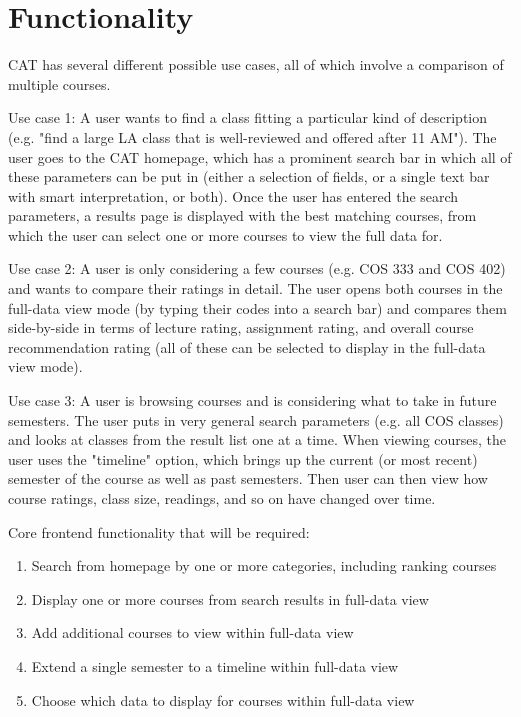 \documentclass[11pt]{article}
\begin{document}
\section{Functionality}
CAT has several different possible use cases, all of which involve a comparison of multiple courses.
\par Use case 1: A user wants to find a class fitting a particular kind of description (e.g. "find a large LA class that is well-reviewed and offered after 11 AM"). The user goes to the CAT homepage, which has a prominent search bar in which all of these parameters can be put in (either a selection of fields, or a single text bar with smart interpretation, or both). Once the user has entered the search parameters, a results page is displayed with the best matching courses, from which the user can select one or more courses to view the full data for.
\par Use case 2: A user is only considering a few courses (e.g. COS 333 and COS 402) and wants to compare their ratings in detail. The user opens both courses in the full-data view mode (by typing their codes into a search bar) and compares them side-by-side in terms of lecture rating, assignment rating, and overall course recommendation rating (all of these can be selected to display in the full-data view mode).
\par Use case 3: A user is browsing courses and is considering what to take in future semesters. The user puts in very general search parameters (e.g. all COS classes) and looks at classes from the result list one at a time. When viewing courses, the user uses the "timeline" option, which brings up the current (or most recent) semester of the course as well as past semesters. Then user can then view how course ratings, class size, readings, and so on have changed over time.

\par Core frontend functionality that will be required:
\begin{enumerate}
\item Search from homepage by one or more categories, including ranking courses
\item Display one or more courses from search results in full-data view
\item Add additional courses to view within full-data view
\item Extend a single semester to a timeline within full-data view
\item Choose which data to display for courses within full-data view
\end{enumerate}
\end{document}
